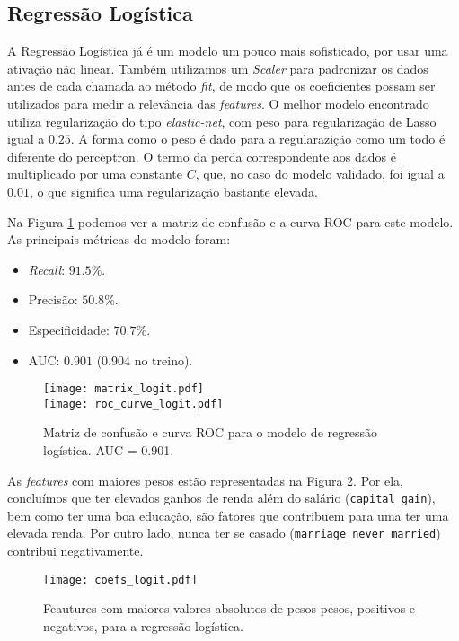 \subsection{Regressão Logística}

A Regressão Logística já é um modelo um pouco mais sofisticado, por usar uma ativação não linear.
Também utilizamos um \emph{Scaler} para padronizar os dados antes de cada chamada ao método \emph{fit}, de modo que os coeficientes possam ser utilizados para medir a relevância das \emph{features}.
O melhor modelo encontrado utiliza regularização do tipo \emph{elastic-net}, com peso para regularização de Lasso igual a \( 0.25 \).
A forma como o peso é dado para a regularazição como um todo é diferente do perceptron.
O termo da perda correspondente aos dados é multiplicado por uma constante \( C \), que, no caso do modelo validado, foi igual a \( 0.01 \), o que significa uma regularização bastante elevada.

Na Figura \ref{logit metric} podemos ver a matriz de confusão e a curva ROC para este modelo.
As principais métricas do modelo foram:
\begin{itemize}
    \item \emph{Recall}: \( 91.5 \% \).
    \item Precisão: \( 50.8 \% \).
    \item Especificidade: \( 70.7 \% \).
    \item AUC: \( 0.901 \) (0.904 no treino).
\end{itemize}
\begin{figure}[htb]
    \begin{center}
        \texttt{[image: matrix\_logit.pdf]} \\
        \texttt{[image: roc\_curve\_logit.pdf]}
    \end{center}
    \caption{Matriz de confusão e curva ROC para o modelo de regressão logística. AUC = 0.901.}
    \label{logit metric}
\end{figure}
As \emph{features} com maiores pesos estão representadas na Figura \ref{logit feature}.
Por ela, concluímos que ter elevados ganhos de renda além do salário (\verb|capital_gain|), bem como ter uma boa educação, são fatores que contribuem para uma ter uma elevada renda.
Por outro lado, nunca ter se casado (\verb|marriage_never_married|) contribui negativamente.
\begin{figure}[htb]
    \begin{center}
        \texttt{[image: coefs\_logit.pdf]}
    \end{center}
    \caption{Feautures com maiores valores absolutos de pesos pesos, positivos e negativos, para a regressão logística.}
    \label{logit feature}
\end{figure}

